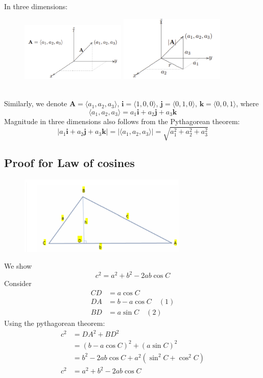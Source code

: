 \documentclass{report}
\begin{document}
In three dimensions:
\begin{figure}[h]
\includegraphics[width=5cm]{Capture65}
\includegraphics[width=5cm]{Capture66}\\
\centering
\end{figure}\\
Similarly, we denote $\mathbf{A}=\langle a_1,a_2,a_3\rangle$, 
$\mathbf{i}=\langle 1,0,0\rangle$, $\mathbf{j}=\langle 0,1,0\rangle$, 
$\mathbf{k}=\langle 0,0,1\rangle$, where
\begin{equation*}
\langle a_1,a_2,a_3\rangle=a_1\mathbf{i}+a_2\mathbf{j}+a_3\mathbf{k}
\end{equation*}
Magnitude in three dimensions also follows from the Pythagorean theorem:
\begin{equation*}
|a_1\mathbf{i}+a_2\mathbf{j}+a_3\mathbf{k}|=|\langle a_1,a_2,a_3\rangle|
=\sqrt{a_1^2+a_2^2+a_3^2}
\end{equation*}
\newpage

\subsection{Proof for Law of cosines} %
\begin{figure}[h]
\includegraphics[width=8cm]{Capture67}\\
\centering
\end{figure}
\noindent We show
\begin{equation*}
c^2=a^2+b^2-2ab\cos C
\end{equation*}
Consider
\begin{align*}
CD&=a\cos C\\
DA&=b-a\cos C\quad(1)\\
BD&=a\sin C\quad(2)
\end{align*}
Using the pythagorean theorem:
\begin{align*}
c^2&=DA^2+BD^2\\
&=(b-a\cos C)^2+(a\sin C)^2\\
&=b^2-2ab\cos C+a^2(\sin^2C+\cos^2C)\\
c^2&=a^2+b^2-2ab\cos C
\end{align*}
\newpage
\end{document}
